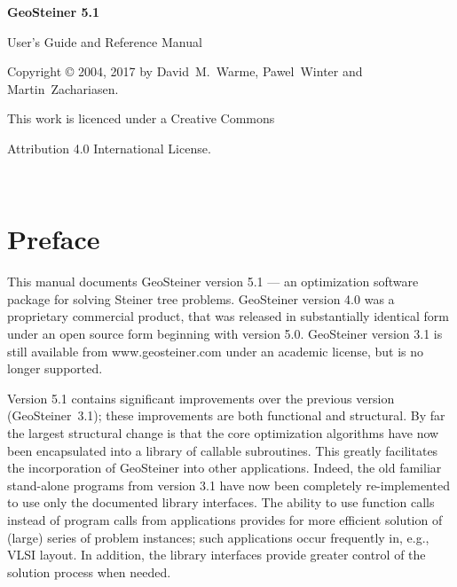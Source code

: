 \documentclass[12pt,twoside,letterpaper]{article}
\def\code#1{{\ttfamily #1}}
\def\geosteiner{Geo\-Steiner}
\newcommand{\GeoSteinerCurrentVersion}{5.1}
\begin{document}
\thispagestyle{empty}
\vspace*{4cm}

\centerline{\Huge\bf \geosteiner{} \GeoSteinerCurrentVersion{}}

\vspace*{3cm}

\centerline{\Large User's Guide and Reference Manual}

\vspace*{10cm}
\centerline{Copyright \copyright{} 2004, 2017 by
 David~M.~Warme, Pawel~Winter and Martin~Zachariasen.}
\centerline{This work is licenced under a Creative Commons}
\centerline{Attribution 4.0 International License.}

\clearpage
\thispagestyle{empty}
~

\clearpage
{}
\tableofcontents

\clearpage
\setlength{\parskip}{1.5ex plus0.1ex minus0.1ex}
\setlength{\parindent}{0ex}

\pagestyle{headings}
\section*{Preface}

This manual documents \geosteiner{} version
\GeoSteinerCurrentVersion{}
--- an optimization software package for solving Steiner tree
problems.
\geosteiner{} version 4.0 was a proprietary commercial product,
that was released in substantially identical form under an open source
form beginning with version 5.0.
\geosteiner{} version 3.1 is still available from
\code{www.geosteiner.com} under an academic license, but is no
longer supported.

Version \GeoSteinerCurrentVersion{} contains significant improvements
over the previous
version (\geosteiner~3.1); these improvements are both functional and
structural.
By far the largest structural change is that the core
optimization algorithms have now been encapsulated into a library of
callable subroutines.  This greatly facilitates the incorporation of
\geosteiner{} into other applications.  Indeed, the old familiar
stand-alone programs from version 3.1 have now been completely
re-implemented to use only the documented library interfaces.  The
ability to use function calls instead of program calls from
applications provides for more efficient solution of (large) series of
problem instances; such applications occur frequently in, e.g., VLSI
layout.  In addition, the library interfaces provide greater control
of the solution process when needed.
\end{document}
